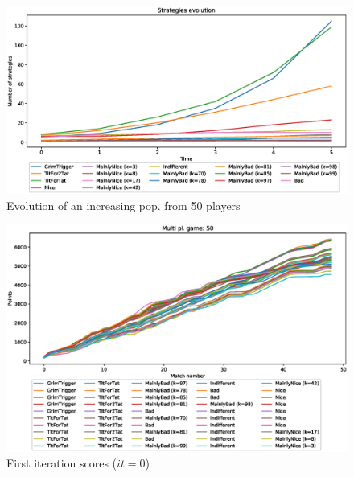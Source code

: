\documentclass[journal,10pt,twoside]{IEEEtran}
\begin{document}
\begin{figure}[!ht]
    \centering
    \includegraphics[width=1\columnwidth]{../img/ripdmp-incr/alt1/ripdmp-evolution-increasing-pop-50}
    \caption{Evolution of an increasing pop. from 50 players}
    \label{fig:incrR}
\end{figure}

\begin{figure}[!ht]
    \centering
    \includegraphics[width=1\columnwidth]{../img/ripdmp-incr/alt1/ripdmp-scores-increasing-pop-50-r0}
    \caption{First iteration scores ($it=0$)}
    \label{fig:incrFI}
\end{figure}

\end{document}
